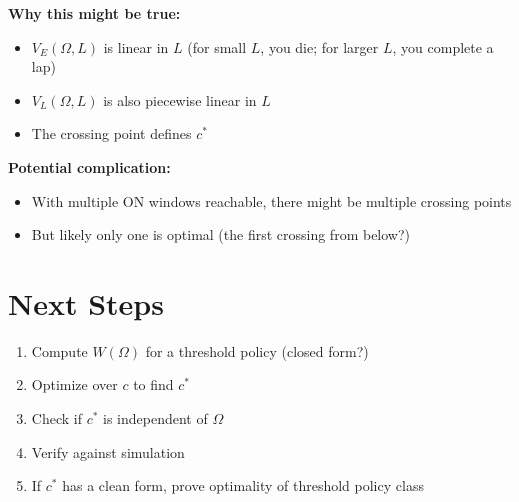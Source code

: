 \documentclass{article}
\begin{document}
\textbf{Why this might be true:}
\begin{itemize}
    \item $V_E(\Omega, L)$ is linear in $L$ (for small $L$, you die; for larger $L$, you complete a lap)
    \item $V_L(\Omega, L)$ is also piecewise linear in $L$
    \item The crossing point defines $c^*$
\end{itemize}

\textbf{Potential complication:}
\begin{itemize}
    \item With multiple ON windows reachable, there might be multiple crossing points
    \item But likely only one is optimal (the first crossing from below?)
\end{itemize}

\section{Next Steps}

\begin{enumerate}
    \item Compute $W(\Omega)$ for a threshold policy (closed form?)
    \item Optimize over $c$ to find $c^*$
    \item Check if $c^*$ is independent of $\Omega$
    \item Verify against simulation
    \item If $c^*$ has a clean form, prove optimality of threshold policy class
\end{enumerate}
\end{document}
